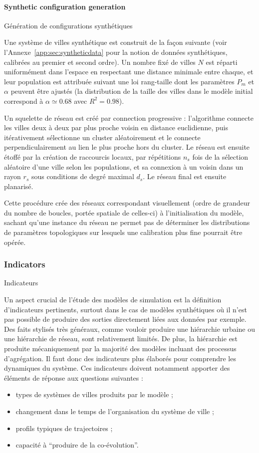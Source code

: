 \paragraph{Synthetic configuration generation}{Génération de configurations synthétiques}

Une système de villes synthétique est construit de la façon suivante (voir l'Annexe~\ref{app:sec:syntheticdata} pour la notion de données synthétiques, calibrées au premier et second ordre). Un nombre fixé de villes $N$ est réparti uniformément dans l'espace en respectant une distance minimale entre chaque, et leur population est attribuée suivant une loi rang-taille dont les paramètres $P_{m}$ et $\alpha$ peuvent être ajustés (la distribution de la taille des villes dans le modèle initial correspond à $\alpha\simeq 0.68$ avec $R^2=0.98$).

Un squelette de réseau est créé par connection progressive : l'algorithme connecte les villes deux à deux par plus proche voisin en distance euclidienne, puis itérativement sélectionne un cluster aléatoirement et le connecte perpendiculairement au lien le plus proche hors du cluster. Le réseau est ensuite étoffé par la création de raccourcis locaux, par répétitions $n_s$ fois de la sélection aléatoire d'une ville selon les populations, et sa connexion à un voisin dans un rayon $r_s$ sous conditions de degré maximal $d_s$. Le réseau final est ensuite planarisé.

Cette procédure crée des réseaux correspondant visuellement (ordre de grandeur du nombre de boucles, portée spatiale de celles-ci) à l'initialisation du modèle, sachant qu'une instance du réseau ne permet pas de déterminer les distributions de paramètres topologiques sur lesquels une calibration plus fine pourrait être opérée.



\subsubsection{Indicators}{Indicateurs}

Un aspect crucial de l'étude des modèles de simulation est la définition d'indicateurs pertinents, surtout dans le cas de modèles synthétiques où il n'est pas possible de produire des sorties directement liées aux données par exemple. Des faits stylisés très généraux, comme vouloir produire une hiérarchie urbaine ou une hiérarchie de réseau, sont relativement limités. De plus, la hiérarchie est produite mécaniquement par la majorité des modèles incluant des processus d'agrégation. Il faut donc des indicateurs plus élaborés pour comprendre les dynamiques du système. Ces indicateurs doivent notamment apporter des éléments de réponse aux questions suivantes : 
 \begin{itemize}
 	\item types de systèmes de villes produits par le modèle ;
 	\item changement dans le temps de l'organisation du système de ville ;
 	\item profils typiques de trajectoires ;
 	\item capacité à ``produire de la co-évolution''.
 \end{itemize}


